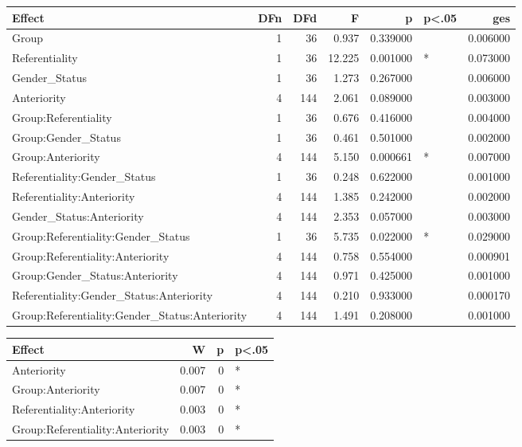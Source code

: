 \documentclass[
]{article}
\begin{document}
\begin{table}

\centering
\begin{tabular}[t]{l|r|r|r|r|l|r}
\hline
Effect & DFn & DFd & F & p & p<.05 & ges\\
\hline
Group & 1 & 36 & 0.937 & 0.339000 &  & 0.006000\\
\hline
Referentiality & 1 & 36 & 12.225 & 0.001000 & * & 0.073000\\
\hline
Gender\_Status & 1 & 36 & 1.273 & 0.267000 &  & 0.006000\\
\hline
Anteriority & 4 & 144 & 2.061 & 0.089000 &  & 0.003000\\
\hline
Group:Referentiality & 1 & 36 & 0.676 & 0.416000 &  & 0.004000\\
\hline
Group:Gender\_Status & 1 & 36 & 0.461 & 0.501000 &  & 0.002000\\
\hline
Group:Anteriority & 4 & 144 & 5.150 & 0.000661 & * & 0.007000\\
\hline
Referentiality:Gender\_Status & 1 & 36 & 0.248 & 0.622000 &  & 0.001000\\
\hline
Referentiality:Anteriority & 4 & 144 & 1.385 & 0.242000 &  & 0.002000\\
\hline
Gender\_Status:Anteriority & 4 & 144 & 2.353 & 0.057000 &  & 0.003000\\
\hline
Group:Referentiality:Gender\_Status & 1 & 36 & 5.735 & 0.022000 & * & 0.029000\\
\hline
Group:Referentiality:Anteriority & 4 & 144 & 0.758 & 0.554000 &  & 0.000901\\
\hline
Group:Gender\_Status:Anteriority & 4 & 144 & 0.971 & 0.425000 &  & 0.001000\\
\hline
Referentiality:Gender\_Status:Anteriority & 4 & 144 & 0.210 & 0.933000 &  & 0.000170\\
\hline
Group:Referentiality:Gender\_Status:Anteriority & 4 & 144 & 1.491 & 0.208000 &  & 0.001000\\
\hline
\end{tabular}
\centering
\begin{tabular}[t]{l|r|r|l}
\hline
Effect & W & p & p<.05\\
\hline
Anteriority & 0.007 & 0 & *\\
\hline
Group:Anteriority & 0.007 & 0 & *\\
\hline
Referentiality:Anteriority & 0.003 & 0 & *\\
\hline
Group:Referentiality:Anteriority & 0.003 & 0 & *\\
\hline

\end{tabular}
\end{table}
\end{document}
